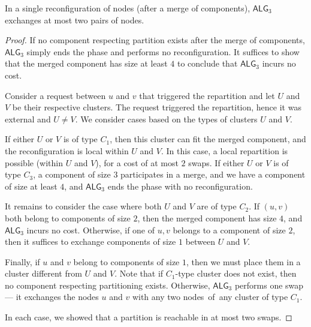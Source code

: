 \documentclass[a4paper,anonymous,USenglish]{lipics-v2019}
\newcommand{\TAlg}{{\ensuremath{\textsf{ALG}_{3}}}\xspace}
\begin{document}
\begin{lemma}
	\label{lem:1req}
	In a single reconfiguration of nodes (after a merge of components), \TAlg exchanges at most two pairs of nodes.
\end{lemma}

\begin{proof}
	If no component respecting partition exists after the merge of components, \TAlg simply ends the phase and performs no reconfiguration.
	It suffices to show that the merged component has size at least $4$ to conclude that \TAlg incurs no cost.
	
	
	Consider a request between $u$ and $v$ that triggered the repartition and let $U$ and $V$ be their respective clusters.
	The request triggered the repartition, hence it was external and $U\neq V$.
	We consider cases based on the types of clusters $U$ and $V$.
	
	If either $U$ or $V$ is of type $C_1$, then this cluster can fit the merged component, and the reconfiguration is local within $U$ and $V$.
	In this case, a local repartition is possible (within $U$ and $V$), for a cost of at most $2$ swaps.
	If either $U$ or $V$ is of type $C_3$, a component of size $3$ participates in a merge, and we have a component of size at least $4$, and \TAlg ends the phase with no reconfiguration.
	
	
	It remains to consider the case where both $U$ and $V$ are of type $C_2$.
	If $(u,v)$ both belong to components of size $2$, then the merged component has size $4$, and \TAlg incurs no cost. 
	Otherwise, if one of $u,v$ belongs to a component of size $2$, then it suffices to exchange components of size $1$ between $U$ and $V$.

	Finally, if $u$ and $v$ belong to components of size $1$, then we must place them in a cluster different from $U$ and $V$.
	Note that if $C_1$-type cluster does not exist, then no component respecting partitioning exists.
	Otherwise, \TAlg performs one swap --- it exchanges the nodes $u$ and $v$ with any two nodes~of~any cluster of type $C_1$.

	In each case, we showed that a partition is reachable in at most two swaps.
\end{proof}
\end{document}
